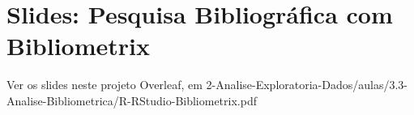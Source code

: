 \chapter{Slides: Pesquisa Bibliográfica com Bibliometrix\label{chap:bibliometrix:slides}}
Ver os slides neste projeto Overleaf, em
2-Analise-Exploratoria-Dados/aulas/3.3-Analise-Bibliometrica/R-RStudio-Bibliometrix.pdf

